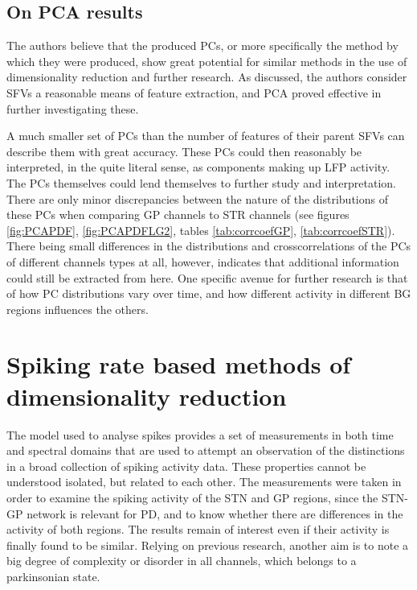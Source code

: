\documentclass{kththesis}
\begin{document}
\subsection{On PCA results}

The authors believe that the produced PCs, or more specifically the method by which they were produced, show great potential for similar methods in the use of dimensionality reduction and further research.
As discussed, the authors consider SFVs a reasonable means of feature extraction, and PCA proved effective in further investigating these.

A much smaller set of PCs than the number of features of their parent SFVs can describe them with great accuracy.
These PCs could then reasonably be interpreted, in the quite literal sense, as components making up LFP activity.
The PCs themselves could lend themselves to further study and interpretation.
There are only minor discrepancies between the nature of the distributions of these PCs when comparing GP channels to STR channels (see figures \ref{fig:PCAPDF}, \ref{fig:PCAPDFLG2}, tables \ref{tab:corrcoefGP}, \ref{tab:corrcoefSTR}).
There being small differences in the distributions and crosscorrelations of the PCs of different channels types at all, however, indicates that additional information could still be extracted from here.
One specific avenue for further research is that of how PC distributions vary over time, and how different activity in different BG regions influences the others.

\section{Spiking rate based methods of dimensionality reduction}

The model used to analyse spikes provides a set of measurements in both time and spectral domains that are used to attempt an observation of the distinctions in a broad collection of spiking activity data. 
These properties cannot be understood isolated, but related to each other. 
The measurements were taken in order to examine the spiking activity of the STN and GP regions, since the STN-GP network is relevant for PD, and to know whether there are differences in the activity of both regions. 
The results remain of interest even if their activity is finally found to be similar. 
Relying on previous research, another aim is to note a big degree of complexity or disorder in all channels, which belongs to a parkinsonian state.
\end{document}
